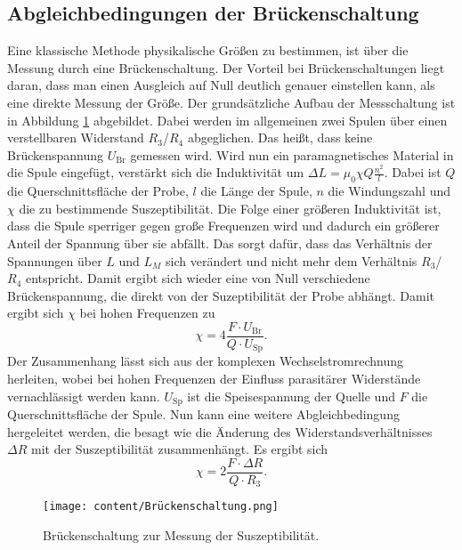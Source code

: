 \subsection{Abgleichbedingungen der Brückenschaltung}
Eine klassische Methode physikalische Größen zu bestimmen, ist über die Messung durch eine Brückenschaltung.
Der Vorteil bei Brückenschaltungen liegt daran, dass man einen Ausgleich auf Null deutlich genauer einstellen kann, als eine direkte Messung der Größe.
Der grundsätzliche Aufbau der Messschaltung ist in Abbildung \ref{fig:Brücke} abgebildet. Dabei werden im allgemeinen zwei Spulen über einen verstellbaren Widerstand
$R_3$/$R_4$ abgeglichen. Das heißt, dass keine Brückenspannung $U_\text{Br}$ gemessen wird. Wird nun ein paramagnetisches Material in 
die Spule eingefügt, verstärkt sich die Induktivität um $\Delta L=\mu_0\chi Q \frac{n^2}{l}$. Dabei ist $Q$ die Querschnittsfläche der Probe, $l$ die Länge der Spule,
$n$ die Windungszahl und $\chi$ die zu bestimmende Suszeptibilität. Die Folge einer größeren Induktivität ist, dass die Spule sperriger
gegen große Frequenzen wird und dadurch ein größerer Anteil der Spannung über sie abfällt. Das sorgt dafür, dass das Verhältnis der Spannungen über $L$ und $L_M$
sich verändert und nicht mehr dem Verhältnis $R_3$/$R_4$ entspricht. Damit ergibt sich wieder eine von Null verschiedene Brückenspannung, die direkt von
der Suzeptibilität der Probe abhängt. Damit ergibt sich $\chi$ bei hohen Frequenzen zu
\begin{equation}
    \chi= 4 \frac{F\cdot U_\text{Br}}{Q\cdot U_\text{Sp}}.
    \label{eq:chiU}
\end{equation}
Der Zusammenhang lässt sich aus der komplexen Wechselstromrechnung herleiten, wobei bei hohen Frequenzen der Einfluss
parasitärer Widerstände vernachlässigt werden kann. $U_\text{Sp}$ ist die Speisespannung der Quelle und $F$ die Querschnittsfläche der Spule.
Nun kann eine weitere Abgleichbedingung hergeleitet werden, die besagt wie die Änderung des Widerstandsverhältnisses $\Delta R$ mit der Suszeptibilität 
zusammenhängt. Es ergibt sich
\begin{equation}
    \chi= 2 \frac{F\cdot \Delta R}{Q\cdot R_3}.
    \label{eq:chiR}
\end{equation}
\begin{figure}[H]
    \centering
    \texttt{[image: content/Brückenschaltung.png]}
    \caption{Brückenschaltung zur Messung der Suszeptibilität.}
    \label{fig:Brücke}
\end{figure}

\cite{sample}

